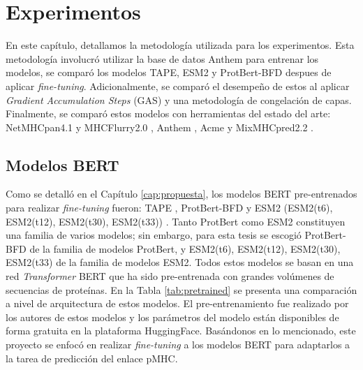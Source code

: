 \chapter{Experimentos}
\label{cap:experimentos}




En este capítulo, detallamos la metodología utilizada para los experimentos. Esta metodología  involucró utilizar la base de datos Anthem \citep{mei2021anthem} para entrenar los modelos, se comparó los modelos TAPE, ESM2 y ProtBert-BFD despues de aplicar \textit{fine-tuning}. Adicionalmente, se comparó el desempeño de estos al aplicar \textit{Gradient Accumulation Steps} (GAS)  y una metodología de congelación de capas. Finalmente, se comparó estos modelos con herramientas del estado del arte: NetMHCpan4.1 \citep{reynisson2020netmhcpan} y MHCFlurry2.0 \citep{o2020mhcflurry}, Anthem \citep{mei2021anthem}, Acme \citep{hu2019acme} y MixMHCpred2.2 \citep{gfeller2023improved}.

\section{Modelos BERT}

Como se detalló en el Capítulo \ref{cap:propuesta}, los modelos BERT pre-entrenados para realizar \textit{fine-tuning} fueron: TAPE \citep{rao2019evaluating}, ProtBert-BFD \citep{elnaggar2021prottrans} y ESM2 (ESM2(t6), ESM2(t12), ESM2(t30), ESM2(t33)) \citep{lin2023evolutionary}. Tanto ProtBert como ESM2 constituyen una familia de varios modelos; sin embargo, para esta tesis se escogió ProtBert-BFD de la familia de modelos ProtBert, y ESM2(t6), ESM2(t12), ESM2(t30), ESM2(t33) de la familia de modelos ESM2. Todos estos modelos se basan en una red \textit{Transformer} BERT que ha sido pre-entrenada con grandes volúmenes de secuencias de proteínas. En la Tabla \ref{tab:pretrained} se presenta una comparación a nivel de arquitectura de estos modelos. El pre-entrenamiento fue realizado por los autores de estos modelos y los parámetros del modelo están disponibles de forma gratuita en la plataforma HuggingFace. Basándonos en lo mencionado, este proyecto se enfocó en realizar \textit{fine-tuning} a los modelos BERT para adaptarlos a la tarea de predicción del enlace pMHC.

